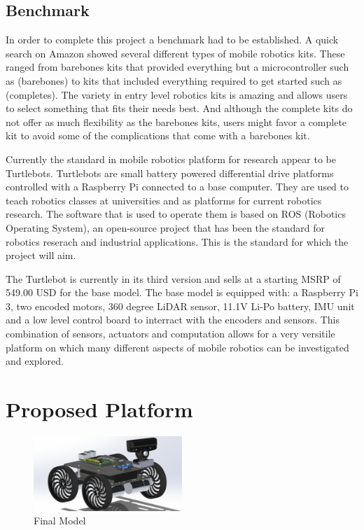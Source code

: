 \documentclass[12pt, letterpaper,titlepage]{article}
\begin{document}
\subsection{Benchmark}

	In order to complete this project a benchmark had to be established. A quick search on Amazon showed several different types of mobile robotics kits. These ranged from barebones kits that provided everything but a microcontroller such as (barebones) to kits that included everything required to get started such as (completes). The variety in entry level robotics kits is amazing and allows users to select something that fits their needs best. And although the complete kits do not offer as much flexibility as the barebones kits, users might favor a complete kit to avoid some of the complications that come with a barebones kit. 

	Currently the standard in mobile robotics platform for research appear to be Turtlebots. Turtlebots are small battery powered differential drive platforms controlled with a Raspberry Pi connected to a base computer. They are used to teach robotics classes at universities and as platforms for current robotics research. The software that is used to operate them is based on ROS (Robotics Operating System), an open-source project that has been the standard for robotics reserach and industrial applications. This is the standard for which the project will aim.

	The Turtlebot is currently in its third version and sells at a starting MSRP of 549.00 USD for the base model. The base model is equipped with: a Raspberry Pi 3, two encoded motors, 360 degree LiDAR sensor, 11.1V Li-Po battery, IMU unit and a low level control board to interract with the encoders and sensors. This combination of sensors, actuators and computation allows for a very versitile platform on which many different aspects of mobile robotics can be investigated and explored.

\section{Proposed Platform}
	\begin{figure}[h]
		\includegraphics[width=0.5\textwidth]{final.png}
		\centering
		\caption{Final Model}
	\end{figure}
\end{document}
